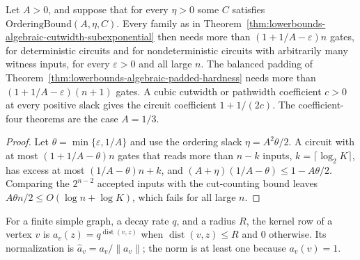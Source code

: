 \begin{theorem}
  \label{thm:lowerbounds-algebraic-cutwidth-coefficient}
  \leanok
  Let $A>0$, and suppose that for every $\eta>0$ some $C$ satisfies
  $\mathrm{OrderingBound}(A,\eta,C)$. Every family as in
  Theorem~\ref{thm:lowerbounds-algebraic-cutwidth-subexponential} then needs
  more than $(1+1/A-\varepsilon)n$ gates, for deterministic circuits and for
  nondeterministic circuits with arbitrarily many witness inputs, for every
  $\varepsilon>0$ and all large $n$. The balanced padding of
  Theorem~\ref{thm:lowerbounds-algebraic-padded-hardness} needs more than
  $(1+1/A-\varepsilon)(n+1)$ gates. A cubic cutwidth or pathwidth
  coefficient $c>0$ at every positive slack gives the circuit coefficient
  $1+1/(2c)$. The coefficient-four theorems are the case $A=1/3$.
\end{theorem}
\begin{proof}
  \leanok
  Let $\theta=\min\{\varepsilon,1/A\}$ and use the ordering slack
  $\eta=A^2\theta/2$. A circuit with at most $(1+1/A-\theta)n$ gates that
  reads more than $n-k$ inputs, $k=\lceil\log_2K\rceil$, has excess at most
  $(1/A-\theta)n+k$, and $(A+\eta)(1/A-\theta)\le1-A\theta/2$. Comparing
  the $2^{n-2}$ accepted inputs with the cut-counting bound leaves
  $A\theta n/2\le O(\log n+\log K)$, which fails for all large $n$.
\end{proof}

\begin{definition}
  \label{def:lowerbounds-algebraic-gaussian-kernel}
  \leanok
  For a finite simple graph, a decay rate $q$, and a radius $R$, the kernel
  row of a vertex $v$ is $a_v(z)=q^{\operatorname{dist}(v,z)}$ when
  $\operatorname{dist}(v,z)\le R$ and $0$ otherwise. Its normalization is
  $\hat a_v=a_v/\lVert a_v\rVert$; the norm is at least one because
  $a_v(v)=1$.
\end{definition}

